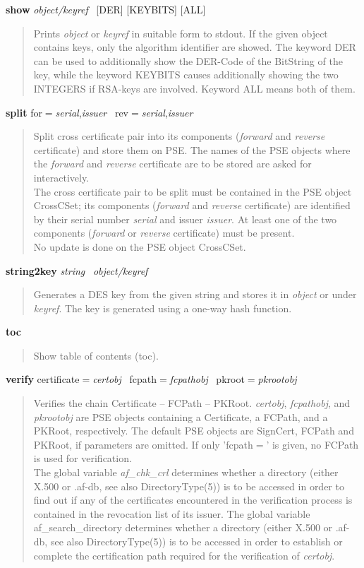 {\bf show} {\em object/keyref}~ [DER] [KEYBITS] [ALL]
\begin{quote}
Prints {\em object} or {\em keyref} in suitable form to stdout. If the given object contains
keys, only the algorithm identifier are showed. The keyword DER can be used to additionally
show the DER-Code of the BitString of the key, while the keyword KEYBITS causes
additionally showing the two INTEGERS if RSA-keys are involved. Keyword ALL means both of them.
\end{quote}


{\bf split} for$=${\em serial},{\em issuer}~ rev$=${\em serial},{\em issuer}
\begin{quote}
Split cross certificate pair into its components ({\em forward} and {\em reverse} certificate)
and store them on PSE. The names of the PSE objects where the {\em forward} and {\em reverse} 
certificate are to be stored are asked for interactively. \\
The cross certificate pair to be split must be contained in the PSE object CrossCSet;
its components ({\em forward} and {\em reverse} certificate) are identified by their serial 
number {\em serial} and issuer {\em issuer}. At least one of the two components 
({\em forward} or {\em reverse} certificate) must be present. \\
No update is done on the PSE object CrossCSet.
\end{quote}

{\bf string2key} {\em string}~ {\em object/keyref} 
\begin{quote}
Generates a DES key from the given string and stores it in {\em object} or under {\em keyref}. The
key is generated using a one-way hash function.
\end{quote}


{\bf toc}
\begin{quote}
Show table of contents (toc). 
\end{quote}


{\bf verify} certificate$=${\em certobj}~ fcpath$=${\em fcpathobj}~ pkroot$=${\em pkrootobj}~ 
\begin{quote}
Verifies the chain Certificate -- FCPath -- PKRoot. {\em certobj}, {\em fcpathobj}, and {\em pkrootobj}
are PSE objects containing a Certificate, a FCPath, and a PKRoot, respectively. The default PSE objects
are SignCert, FCPath and PKRoot, if parameters are omitted. If only 'fcpath$=$' is given,
no FCPath is used for verification. \\
The global variable {\em af\_chk\_crl} determines whether a directory (either X.500 or .af-db, see also 
DirectoryType(5)) is to be accessed
in order to find out if any of the certificates encountered in the verification process is 
contained in the revocation list of its issuer.
The global variable {af\_search\_directory} determines whether a directory (either X.500 or .af-db, see also 
DirectoryType(5)) is to be accessed
in order to establish or complete the certification path required for the verification of {\em certobj}. 
\end{quote}


